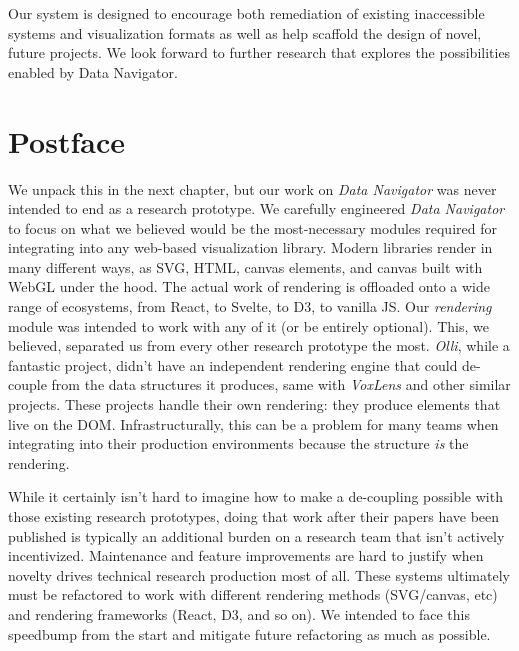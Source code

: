 \documentclass[12pt]{cmuthesis}
\begin{document}
Our system is designed to encourage both remediation of existing inaccessible systems and visualization formats as well as help scaffold the design of novel, future projects. We look forward to further research that explores the possibilities enabled by Data Navigator.

\newpage

\section{Postface}

We unpack this in the next chapter, but our work on \textit{Data Navigator} was never intended to end as a research prototype. We carefully engineered \textit{Data Navigator} to focus on what we believed would be the most-necessary modules required for integrating into any web-based visualization library. Modern libraries render in many different ways, as SVG, HTML, canvas elements, and canvas built with WebGL under the hood. The actual work of rendering is offloaded onto a wide range of ecosystems, from React, to Svelte, to D3, to vanilla JS. Our \textit{rendering} module was intended to work with any of it (or be entirely optional). This, we believed, separated us from every other research prototype the most. \textit{Olli}, while a fantastic project, didn't have an independent rendering engine that could de-couple from the data structures it produces, same with \textit{VoxLens} and other similar projects. These projects handle their own rendering: they produce elements that live on the DOM. Infrastructurally, this can be a problem for many teams when integrating into their production environments because the structure \textit{is} the rendering.

While it certainly isn't hard to imagine how to make a de-coupling possible with those existing research prototypes, doing that work after their papers have been published is typically an additional burden on a research team that isn't actively incentivized. Maintenance and feature improvements are hard to justify when novelty drives technical research production most of all. These systems ultimately must be refactored to work with different rendering methods (SVG/canvas, etc) and rendering frameworks (React, D3, and so on). We intended to face this speedbump from the start and mitigate future refactoring as much as possible.
\end{document}
